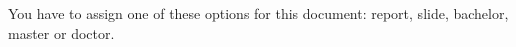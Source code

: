\iftyp@doctor
	\def\englishdegreename{Doctor}
	\def\englishbooktitle{Doctoral Dissertation}
	\def\englishthesistype{A dissertation}
	\def\englishthesistypea{DISSERTATION}
\else
	{You have to assign one of these options for this document: report, slide, bachelor, master or doctor.}{}
\fi
